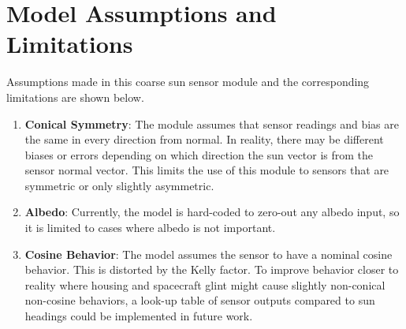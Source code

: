 \section{Model Assumptions and Limitations}
Assumptions made in this coarse sun sensor module and the corresponding limitations are shown below.
\begin{enumerate}
	\item \textbf{Conical Symmetry}: The module assumes that sensor readings and bias are the same in every direction from normal. In reality, there may be different biases or errors depending on which direction the sun vector is from the sensor normal vector. This limits the use of this module to sensors that are symmetric or only slightly asymmetric.
	\item \textbf{Albedo}: Currently, the model is hard-coded to zero-out any albedo input, so it is limited to cases where albedo is not important.
	\item \textbf{Cosine Behavior}: The model assumes the sensor to have a nominal cosine behavior. This is distorted by the Kelly factor. To improve behavior closer to reality where housing and spacecraft glint might cause slightly non-conical non-cosine behaviors, a look-up table of sensor outputs compared to sun headings could be implemented in future work.
\end{enumerate}